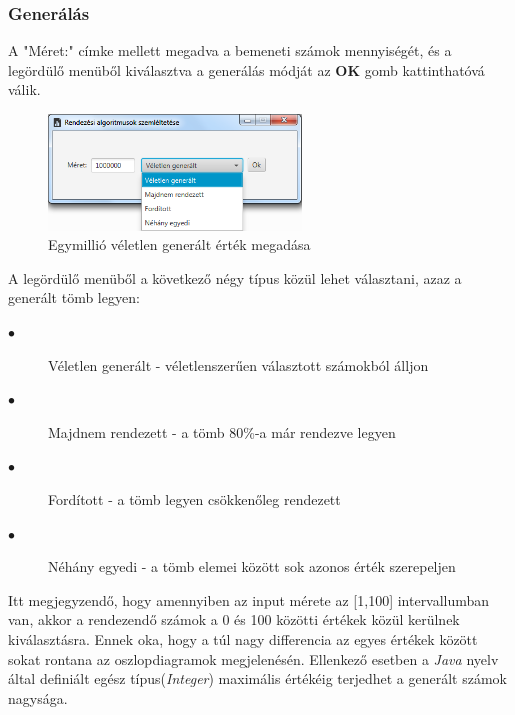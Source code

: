 \documentclass{elteikthesis}
\begin{document}
\subsubsection{Generálás}
A "Méret:" címke mellett megadva a bemeneti számok mennyiségét, és a legördülő menüből kiválasztva a generálás módját az \textbf{OK} gomb kattinthatóvá válik.
\begin{figure}[H]
	\centering
	\includegraphics[width=0.6\textwidth]{pics/randominput.png}
	\caption{Egymillió véletlen generált érték megadása}
\end{figure}
 A legördülő menüből a következő négy típus közül lehet választani, azaz a generált tömb legyen:
\begin{description}
	\item[$\bullet$] Véletlen generált - véletlenszerűen választott számokból álljon
	\item[$\bullet$] Majdnem rendezett - a tömb 80\%-a már rendezve legyen
	\item[$\bullet$] Fordított - a tömb legyen csökkenőleg rendezett
	\item[$\bullet$] Néhány egyedi - a tömb elemei között sok azonos érték szerepeljen
\end{description}
Itt megjegyzendő, hogy amennyiben az input mérete az [1,100] intervallumban van, akkor a rendezendő számok a 0 és 100 közötti értékek közül kerülnek kiválasztásra. Ennek oka, hogy a túl nagy differencia az egyes értékek között sokat rontana az oszlopdiagramok megjelenésén. Ellenkező esetben a \emph{Java} nyelv által definiált egész típus(\emph{Integer}) maximális értékéig terjedhet a generált számok nagysága.
 
\end{document}
